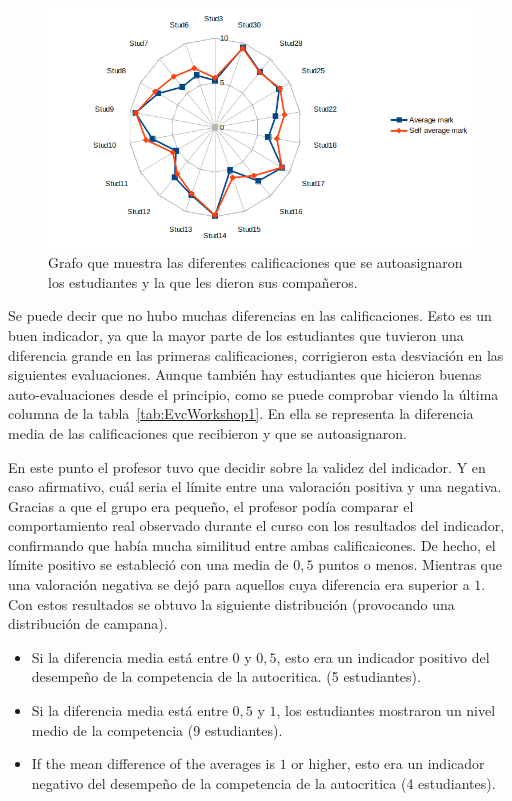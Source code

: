 \begin{figure}
	\centering
	\includegraphics[width=12cm]{EvcWorkshop1.png}
	\caption{Grafo que muestra las diferentes calificaciones que se autoasignaron los estudiantes y la que les dieron sus compañeros.}
	\label{fig:EvcWorkshop1}
\end{figure}

Se puede decir que no hubo muchas diferencias en las calificaciones. Esto es un buen indicador, ya que la mayor parte de los estudiantes que tuvieron una diferencia grande en las primeras calificaciones, corrigieron esta desviación en las siguientes evaluaciones. Aunque también hay estudiantes que hicieron buenas auto-evaluaciones desde el principio, como se puede comprobar viendo la última columna de la tabla~\ref{tab:EvcWorkshop1}. En ella se representa la diferencia media de las calificaciones que recibieron y que se autoasignaron.

En este punto el profesor tuvo que decidir sobre la validez del indicador. Y en caso afirmativo, cuál seria el límite entre una valoración positiva y una negativa. Gracias a que el grupo era pequeño, el profesor podía comparar el comportamiento real observado durante el curso con los resultados del indicador, confirmando que había mucha similitud entre ambas calificaicones. De hecho, el límite positivo se estableció con una media de $0,5$ puntos o menos. Mientras que una valoración negativa se dejó para aquellos cuya diferencia era superior a $1$. Con estos resultados se obtuvo la siguiente distribución (provocando una distribución de campana).

\begin{itemize}
\item Si la diferencia media está entre $0$ y $0,5$, esto era un indicador positivo del desempeño de la competencia de la autocritica. (5 estudiantes).
\item Si la diferencia media está entre $0,5$ y $1$, los estudiantes mostraron un nivel medio de la competencia (9 estudiantes).
\item If the mean difference of the averages is $1$ or higher, esto era un indicador negativo del desempeño de la competencia de la autocritica (4 estudiantes).
\end{itemize}

